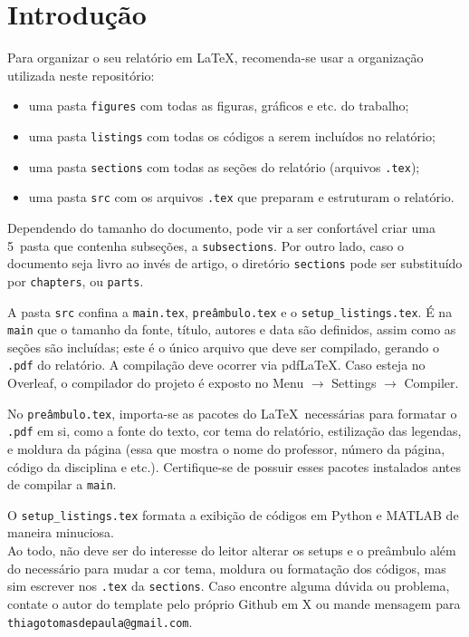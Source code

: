 \section{Introdução}
    Para organizar o seu relatório em \LaTeX, recomenda-se usar a organização utilizada neste repositório:
    \begin{itemize}
        \item uma pasta {\tt figures} com todas as figuras, gráficos e etc. do trabalho;
        \item uma pasta {\tt listings} com todas os códigos a serem incluídos no relatório;
        \item uma pasta {\tt sections} com todas as seções do relatório (arquivos {\tt.tex});
        \item uma pasta {\tt src} com os arquivos {\tt.tex} que preparam e estruturam o relatório.
    \end{itemize}

    Dependendo do tamanho do documento, pode vir a ser confortável criar uma 5\textordfeminine~pasta que contenha subseções, a {\tt subsections}.
    Por outro lado, caso o documento seja livro ao invés de artigo, o diretório {\tt sections} pode ser substituído por {\tt chapters}, ou {\tt parts}. 

    A pasta {\tt src} confina a {\tt main.tex}, {\tt preâmbulo.tex} e o {\tt setup\_listings.tex}.
    É na {\tt main} que o tamanho da fonte, título, autores e data são definidos, assim como as seções são incluídas; 
    este é o único arquivo que deve ser compilado, gerando o {\tt.pdf} do relatório.
    A compilação deve ocorrer via pdfLaTeX. Caso esteja no Overleaf, o compilador do projeto é exposto no Menu $\to$ Settings $\to$ Compiler.
    
    No {\tt preâmbulo.tex}, importa-se as pacotes do \LaTeX~necessárias para formatar o {\tt.pdf} em si, como a fonte do texto, cor tema do relatório, estilização das legendas, e moldura da página (essa que mostra o nome do professor, número da página, código da disciplina e etc.).
    Certifique-se de possuir esses pacotes instalados antes de compilar a {\tt main}.

    O {\tt setup\_listings.tex} formata a exibição de códigos em Python e MATLAB de maneira minuciosa.\\

    Ao todo, não deve ser do interesse do leitor alterar os setups e o preâmbulo além do necessário para mudar a cor tema, moldura ou formatação dos códigos, mas sim escrever nos {\tt.tex} da {\tt sections}.
    Caso encontre alguma dúvida ou problema, contate o autor do template pelo próprio Github em X ou mande mensagem para {\tt thiagotomasdepaula@gmail.com}.